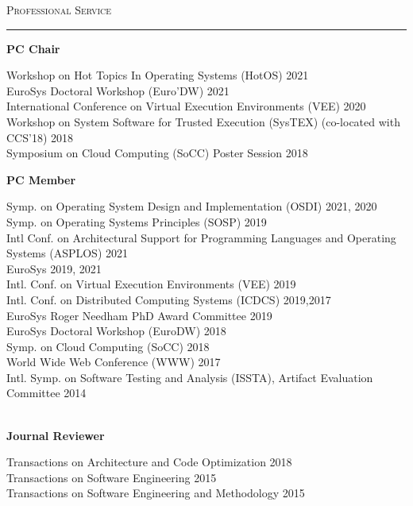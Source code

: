 \documentclass[10pt]{article}
\newcommand{\mysec}[1]{\vspace{2em}\textsc{\large #1}\vspace{1mm}\hrule\vspace{2mm}}
\newcommand{\mysub}[3]{\textbf{#1} {#2} \hfill {\em #3}}
\newcommand{\myssub}[1]{\hspace*{2mm}\parbox{163mm}{#1}\vspace*{2mm}}
\begin{document}
\mysec{Professional Service}


\mysub{PC Chair}{}{}\\
\myssub{\vspace{2mm}
  Workshop on Hot Topics In Operating Systems (HotOS) \hfill 2021 \\
  EuroSys Doctoral Workshop (Euro'DW) \hfill 2021 \\
  International Conference on Virtual Execution Environments (VEE) \hfill 2020 \\
  Workshop on System Software for Trusted Execution (SysTEX) (co-located with CCS'18) \hfill 2018 \\
  Symposium on Cloud Computing (SoCC) Poster Session \hfill 2018 \\
}

\mysub{PC Member}{}{}\\
\myssub{\vspace{2mm}
  Symp. on Operating System Design and Implementation (OSDI) \hfill 2021, 2020 \\
  Symp. on Operating Systems Principles (SOSP) \hfill 2019 \\
  Intl Conf. on Architectural Support for Programming Languages and Operating Systems (ASPLOS) \hfill 2021 \\
  EuroSys \hfill 2019, 2021 \\
  Intl. Conf. on Virtual Execution Environments (VEE) \hfill 2019 \\
  Intl. Conf. on Distributed Computing Systems (ICDCS) \hfill 2019,2017 \\
  EuroSys Roger Needham PhD Award Committee \hfill 2019 \\  
  EuroSys Doctoral Workshop (EuroDW) \hfill 2018 \\
  Symp. on Cloud Computing (SoCC) \hfill 2018 \\
  World Wide Web Conference (WWW) \hfill 2017 \\
  Intl. Symp. on Software Testing and Analysis (ISSTA), Artifact Evaluation Committee \hfill 2014 \\
}\\

\mysub{Journal Reviewer}{}{} \\
\myssub{\vspace{2mm}Transactions on Architecture and Code Optimization \hfill 2018\\
  Transactions on Software Engineering \hfill 2015 \\
  Transactions on Software Engineering and Methodology \hfill 2015} \\
\end{document}
